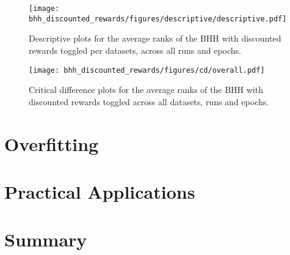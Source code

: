 \begin{figure}[htbp]
	\centering
	\texttt{[image: bhh\_discounted\_rewards/figures/descriptive/descriptive.pdf]}
	\caption{Descriptive plots for the average ranks of the \acs{BHH} with discounted rewards toggled per datasets, across all runs and epochs.}
	\label{fig:results:discounted_rewards:descriptive:descriptive}
\end{figure}

\begin{figure}[htbp]
	\centering
	\texttt{[image: bhh\_discounted\_rewards/figures/cd/overall.pdf]}
	\caption{Critical difference plots for the average ranks of the \acs{BHH} with discounted rewards toggled across all datasets, runs and epochs.}
	\label{fig:results:discounted_rewards:descriptive:cd}
\end{figure}

\section{Overfitting}\label{sec:results:overfitting}

\section{Practical Applications}\label{sec:results:practical_applications}

\section{Summary}\label{sec:results:summary}